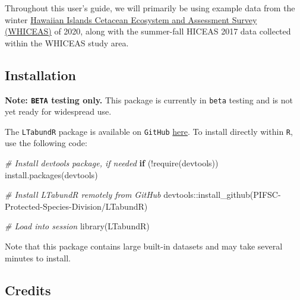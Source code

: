 \documentclass[
]{book}
\newenvironment{Shaded}{\begin{snugshade}}{\end{snugshade}}
\newcommand{\CommentTok}[1]{\textcolor[rgb]{0.56,0.35,0.01}{\textit{#1}}}
\newcommand{\ControlFlowTok}[1]{\textcolor[rgb]{0.13,0.29,0.53}{\textbf{#1}}}
\newcommand{\FunctionTok}[1]{\textcolor[rgb]{0.00,0.00,0.00}{#1}}
\newcommand{\NormalTok}[1]{#1}
\newcommand{\SpecialCharTok}[1]{\textcolor[rgb]{0.00,0.00,0.00}{#1}}
\newcommand{\StringTok}[1]{\textcolor[rgb]{0.31,0.60,0.02}{#1}}
\begin{document}
Throughout this user's guide, we will primarily be using example data from the winter \href{https://repository.library.noaa.gov/view/noaa/47788}{Hawaiian Islands Cetacean Ecosystem and Assessment Survey (WHICEAS)} of 2020, along with the summer-fall HICEAS 2017 data collected within the WHICEAS study area.

\hypertarget{installation}{%
\subsection*{Installation}\label{installation}}

\textbf{Note: \texttt{BETA} testing only.} This package is currently in \texttt{beta} testing and is not yet ready for widespread use.

The \texttt{LTabundR} package is available on \texttt{GitHub} \href{https://github.com/PIFSC-Protected-Species-Division/LTabundR}{here}. To install directly within \texttt{R}, use the following code:

\begin{Shaded}
\begin{Highlighting}[]
\CommentTok{\# Install \textquotesingle{}devtools\textquotesingle{} package, if needed}
\ControlFlowTok{if}\NormalTok{ (}\SpecialCharTok{!}\FunctionTok{require}\NormalTok{(}\StringTok{\textquotesingle{}devtools\textquotesingle{}}\NormalTok{)) }\FunctionTok{install.packages}\NormalTok{(}\StringTok{\textquotesingle{}devtools\textquotesingle{}}\NormalTok{)}

\CommentTok{\# Install LTabundR remotely from GitHub}
\NormalTok{devtools}\SpecialCharTok{::}\FunctionTok{install\_github}\NormalTok{(}\StringTok{\textquotesingle{}PIFSC{-}Protected{-}Species{-}Division/LTabundR\textquotesingle{}}\NormalTok{)}
\end{Highlighting}
\end{Shaded}

\begin{Shaded}
\begin{Highlighting}[]
\CommentTok{\# Load into session}
\FunctionTok{library}\NormalTok{(LTabundR)}
\end{Highlighting}
\end{Shaded}

Note that this package contains large built-in datasets and may take several minutes to install.

\hypertarget{credits}{%
\subsection*{Credits}\label{credits}}
\end{document}
